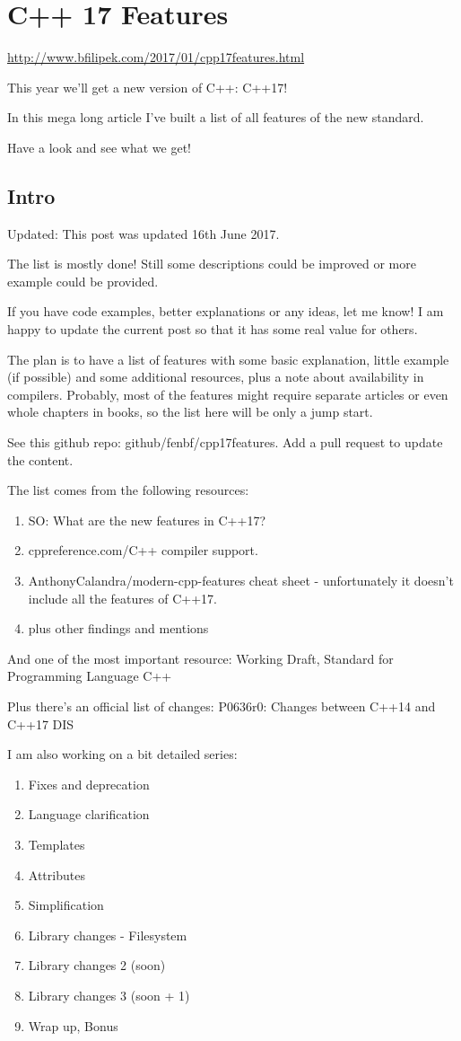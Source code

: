 \chapter{C++ 17 Features}
\url{http://www.bfilipek.com/2017/01/cpp17features.html}

This year we’ll get a new version of C++: C++17!

In this mega long article I’ve built a list of all features of the new standard. 

Have a look and see what we get!

\section{Intro}

Updated: This post was updated 16th June 2017.

The list is mostly done! Still some descriptions could be improved or more example could be provided.

If you have code examples, better explanations or any ideas, let me know! I am happy to update the current post so that it has some real value for others.

The plan is to have a list of features with some basic explanation, little example (if possible) and some additional resources, plus a note about availability in compilers. Probably, most of the features might require separate articles or even whole chapters in books, so the list here will be only a jump start.

See this github repo: github/fenbf/cpp17features. Add a pull request to update the content.

The list comes from the following resources:
\begin{enumerate}
\item SO: What are the new features in C++17?
\item cppreference.com/C++ compiler support.
\item AnthonyCalandra/modern-cpp-features cheat sheet - unfortunately it doesn’t include all the features of C++17.
\item plus other findings and mentions
\end{enumerate}

And one of the most important resource: Working Draft, Standard for Programming Language C++

Plus there’s an official list of changes: P0636r0: Changes between C++14 and C++17 DIS

I am also working on a bit detailed series:
\begin{enumerate}
    \item Fixes and deprecation
    \item Language clarification
    \item Templates
    \item Attributes
    \item Simplification
    \item Library changes - Filesystem
    \item Library changes 2 (soon)
    \item Library changes 3 (soon + 1)
    \item Wrap up, Bonus
\end{enumerate}

